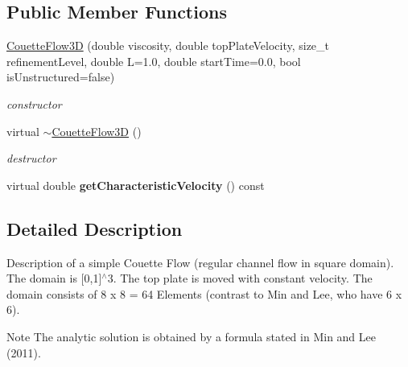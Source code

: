 \subsection*{Public Member Functions}
\begin{DoxyCompactItemize}
\item 
\hyperlink{classnatrium_1_1CouetteFlow3D_ae7dd1be0d19989bb3b015492b59c0e06}{CouetteFlow3D} (double viscosity, double topPlateVelocity, size\_\-t refinementLevel, double L=1.0, double startTime=0.0, bool isUnstructured=false)
\begin{DoxyCompactList}\small\item\em constructor \item\end{DoxyCompactList}\item 
\hypertarget{classnatrium_1_1CouetteFlow3D_a2d1b9db247ba3e51ed092dab3637a657}{
virtual \hyperlink{classnatrium_1_1CouetteFlow3D_a2d1b9db247ba3e51ed092dab3637a657}{$\sim$CouetteFlow3D} ()}
\label{classnatrium_1_1CouetteFlow3D_a2d1b9db247ba3e51ed092dab3637a657}

\begin{DoxyCompactList}\small\item\em destructor \item\end{DoxyCompactList}\item 
\hypertarget{classnatrium_1_1CouetteFlow3D_a38cc986a0f45a5ec7ef56fefc9e342df}{
virtual double {\bfseries getCharacteristicVelocity} () const }
\label{classnatrium_1_1CouetteFlow3D_a38cc986a0f45a5ec7ef56fefc9e342df}

\end{DoxyCompactItemize}


\subsection{Detailed Description}
Description of a simple Couette Flow (regular channel flow in square domain). The domain is \mbox{[}0,1\mbox{]}$^\wedge$3. The top plate is moved with constant velocity. The domain consists of 8 x 8 = 64 Elements (contrast to Min and Lee, who have 6 x 6). \begin{DoxyNote}{Note}
The analytic solution is obtained by a formula stated in Min and Lee (2011). 
\end{DoxyNote}


